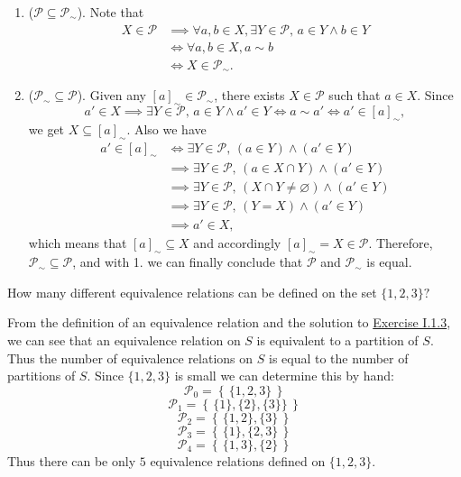 \documentclass[12pt,letterpaper,boxed]{hmcpset}
\newcommand{\set}[1]{\left\{\,#1\,\right\}}
\begin{document}
\begin{solution}
	\begin{enumerate}
		\item ($\mathscr{P}\subseteq\mathscr{P}_{\sim}$). Note that
		\begin{align*}
			X\in\mathscr{P}&\implies\forall a,b\in X,\exists Y\in\mathscr{P},\,a\in Y \land b\in Y\\
			&\iff\forall a,b\in X,a\sim b\\			
			&\iff X\in\mathscr{P}_{\sim}.
		\end{align*}
		\item ($\mathscr{P}_{\sim}\subseteq\mathscr{P}$). Given any $\left[a\right]_{\sim}\in\mathscr{P}_{\sim}$, there exists $X\in\mathscr{P}$ such that $a\in X$. Since 
		\[
		a'\in X\implies\exists Y\in\mathscr{P},\,a\in Y \land a'\in Y\iff a\sim a'\iff a'\in \left[a\right]_{\sim},
		\]
		we get $X\subseteq \left[a\right]_{\sim}$. Also we have 
		\begin{align*}
		a'\in \left[a\right]_{\sim}&\iff \exists Y\in\mathscr{P},\,(a\in Y) \land (a'\in Y)\\
		&\implies \exists Y\in\mathscr{P},\,(a\in X\cap Y) \land(a'\in Y)\\
		&\implies \exists Y\in\mathscr{P},\, (X\cap Y\ne\varnothing)\land (a'\in Y)\\
		&\implies \exists Y\in\mathscr{P},\, (Y=X)\land (a'\in Y)\\
		&\implies 	a'\in X,
		\end{align*}
		which means that $\left[a\right]_{\sim}\subseteq X$ and accordingly $\left[a\right]_{\sim}=X\in\mathscr{P}$. Therefore,
		$\mathscr{P}_{\sim}\subseteq\mathscr{P}$, and with 1. we can finally conclude that $\mathscr{P}$ and $\mathscr{P}_{\sim}$ is equal.
	\end{enumerate}
\end{solution}


\begin{problem}[1.4]
	How many different equivalence relations can be defined on the set $\{1,2,3\}?$
\end{problem}

\begin{solution}
	From the definition of an equivalence relation and the solution to \hyperlink{Exercise I.1.3}{Exercise I.1.3}, we can see that an equivalence relation on $S$ is equivalent to
	a partition of $S$. Thus the number of equivalence relations on $S$ is equal to
	the number of partitions of $S$. Since $\{1,2,3\}$ is small we can determine
	this by hand:
	\[ \mathscr{P}_0 = \set{\{1,2,3\}} \]
	\[ \mathscr{P}_1 = \set{\{1\},\{2\},\{3\}\}} \]
	\[ \mathscr{P}_2 = \set{\{1,2\},\{3\}} \]
	\[ \mathscr{P}_3 = \set{\{1\},\{2,3\}} \]
	\[ \mathscr{P}_4 = \set{\{1,3\},\{2\}} \]
	Thus there can be only $5$ equivalence relations defined on $\{1,2,3\}$.
\end{solution}
\end{document}
